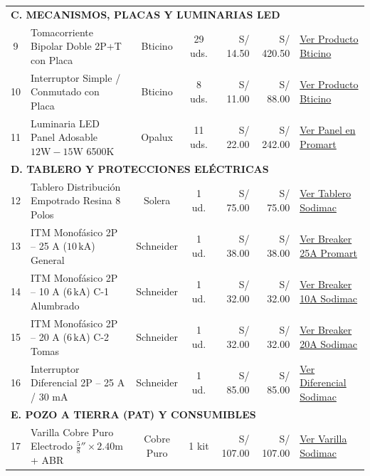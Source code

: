 \documentclass[11pt,a4paper]{article}
\begin{document}
\begin{table}[H]
\begin{tabularx}{\textwidth}{c X c c r r X}
\midrule
\multicolumn{7}{l}{\textbf{\color{AccentBlue}\textbf{C. MECANISMOS, PLACAS Y LUMINARIAS LED}}} \\
9 & Tomacorriente Bipolar Doble 2P+T con Placa & Bticino & 29 uds. & S/ 14.50 & S/ 420.50 & \href{https://www.promart.pe/tomacorriente-doble-con-tierra-modus-pro-blanco-bticino-124902/p}{Ver Producto Bticino} \\
10 & Interruptor Simple / Conmutado con Placa & Bticino & 8 uds. & S/ 11.00 & S/ 88.00 & \href{https://www.sodimac.com.pe/sodimac-pe/product/2485912/interruptor-simple-modus-pro-blanco-bticino/2485912}{Ver Producto Bticino} \\
11 & Luminaria LED Panel Adosable $12\text{W}-15\text{W}$ 6500K & Opalux & 11 uds. & S/ 22.00 & S/ 242.00 & \href{https://www.promart.pe/panel-led-adosable-redondo-15w-luz-blanca-opalux-138402/p}{Ver Panel en Promart} \\
\midrule
\multicolumn{7}{l}{\textbf{\color{AccentBlue}\textbf{D. TABLERO Y PROTECCIONES ELÉCTRICAS}}} \\
12 & Tablero Distribución Empotrado Resina 8 Polos & Solera & 1 ud. & S/ 75.00 & S/ 75.00 & \href{https://www.sodimac.com.pe/sodimac-pe/product/3582012/tablero-de-distribucion-empotrado-8-polos-solera/3582012}{Ver Tablero Sodimac} \\
13 & ITM Monofásico 2P -- 25 A ($10\,\text{kA}$) General & Schneider & 1 ud. & S/ 38.00 & S/ 38.00 & \href{https://www.promart.pe/interruptor-termomagnetico-2p-25a-schneider-119402/p}{Ver Breaker 25A Promart} \\
14 & ITM Monofásico 2P -- 10 A ($6\,\text{kA}$) C-1 Alumbrado & Schneider & 1 ud. & S/ 32.00 & S/ 32.00 & \href{https://www.sodimac.com.pe/sodimac-pe/product/239102/interruptor-termomagnetico-2p-10a-schneider/239102}{Ver Breaker 10A Sodimac} \\
15 & ITM Monofásico 2P -- 20 A ($6\,\text{kA}$) C-2 Tomas & Schneider & 1 ud. & S/ 32.00 & S/ 32.00 & \href{https://www.sodimac.com.pe/sodimac-pe/product/239102/interruptor-termomagnetico-2p-20a-schneider/239102}{Ver Breaker 20A Sodimac} \\
16 & Interruptor Diferencial 2P -- 25 A / 30 mA & Schneider & 1 ud. & S/ 85.00 & S/ 85.00 & \href{https://www.sodimac.com.pe/sodimac-pe/product/239105/interruptor-diferencial-2p-25a-30ma-schneider/239105}{Ver Diferencial Sodimac} \\
\midrule
\multicolumn{7}{l}{\textbf{\color{AccentBlue}\textbf{E. POZO A TIERRA (PAT) Y CONSUMIBLES}}} \\
17 & Varilla Cobre Puro Electrodo $\frac{5}{8}'' \times 2.40\text{m}$ + ABR & Cobre Puro & 1 kit & S/ 107.00 & S/ 107.00 & \href{https://www.sodimac.com.pe/sodimac-pe/product/182941/varilla-de-cobre-5-8-x-2.40-m/182941}{Ver Varilla Sodimac} \\

\end{tabularx}
\end{table}
\end{document}
